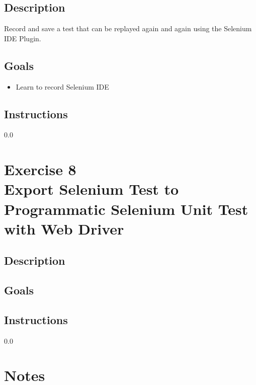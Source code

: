 \subsection*{Description}
Record and save a test that can be replayed again and again using
the Selenium IDE Plugin.

\subsection*{Goals}
\begin{itemize}
  \item Learn to record Selenium IDE 
\end{itemize}

\subsection*{Instructions}

{\setlength{\baselineskip}%
  {0.0\baselineskip}
  \section*{\flushright Exercise 8\\
  Export Selenium Test to
  Programmatic Selenium Unit Test with Web Driver}
  \hrulefill \par}

\subsection*{Description}

\subsection*{Goals}

\subsection*{Instructions}


\newpage
  {\setlength{\baselineskip}%
           {0.0\baselineskip}
  \section*{Notes}
  \hrulefill \par}